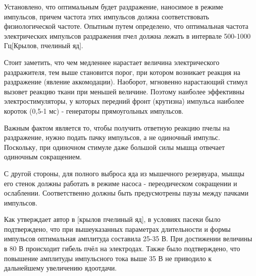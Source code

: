 Установлено, что оптимальным будет раздражение, наносимое в режиме импульсов, причем частота этих импульсов должна соответствовать физиологической частоте. Опытным путем определено, что оптимальная частота электрических импульсов раздражения пчел должна лежать в интервале 500-1000 Гц[Крылов, пчелиный яд].

Стоит заметить, что чем медленнее нарастает величина электрического раздражителя, тем выше становится порог, при котором возникает реакция на раздражение (явление аккомодации). Наоборот, мгновенно нарастающий стимул вызовет реакцию ткани при меньшей величине. Поэтому наиболее эффективны электростимуляторы, у которых передний фронт (крутизна) импульса наиболее короток (0,5-1 мс) - генераторы прямоугольных импульсов.

Важным фактом является то, чтобы получить ответную реакцию пчелы на раздражение, нужно подать пачку импульсов, а не одиночный импульс. Поскольку, при одиночном стимуле даже большой силы мышца отвечает одиночным сокращением.

С другой стороны, для полного выброса яда из мышечного резервуара, мышцы его стенок должны работать в режиме насоса - переодическом сокращении и ослаблении. Соответственно должны быть предусмотрены паузы между пачками импульсов.

Как утверждает автор в [крылов пчелиный яд], в условиях пасеки было подтверждено, что при вышеуказанных параметрах длительности и формы импульсов оптимальная амплитуда составила 25-35 В. При достижении величины в 80 В происходит гибель пчёл на электродах. Также было подтверждено, что повышение амплитуды импульсного тока выше 35 В не приводило к дальнейшему увеличению ядоотдачи.